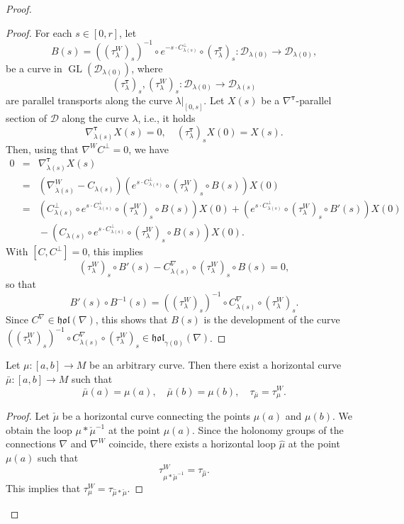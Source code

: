 \documentclass[10pt,a4paper]{amsart}
\newcommand{\D}{{\mathcal D}}
\newcommand{\GL}{\operatorname{GL}}
\newcommand{\bt}{{\boldsymbol{\tau}}}
\newcommand{\hol}{\mathfrak{hol}}
\begin{document}
\begin{proof}
\begin{proof}  For each $s\in [0,r]$, let 
$$B(s)=((\tau_\lambda^W)_s)^{-1}\circ e^{-s\cdot C^\bot_{\lambda(s)}}\circ (\tau_\lambda^\bt)_s:\D_{\lambda(0)}\to \D_{\lambda(0)},$$
be a curve in $\GL(\D_{\lambda(0)})$,
where $$(\tau_\lambda^\bt)_s,(\tau_\lambda^W)_s:\D_{\lambda(0)}\to\D_{\lambda(s)}$$ are parallel transports along the curve $\lambda|_{[0,s]}$.
Let $X(s)$ be a $\nabla^\bt$-parallel section of $\D$ along the curve $\lambda$, i.e., it holds
$$\nabla^\bt_{\dot\lambda(s)}X(s)=0,\quad (\tau_\lambda^\bt)_s X(0)=X(s). $$
Then, using that   $\nabla^W C^\perp=0$, we have 
\begin{eqnarray*}
0&=&\nabla_{\dot\lambda(s)}^\bt X(s)
\\
&=&\left(\nabla^W_{\dot\lambda(s)}-C_{\lambda(s)} \right) \left( e^{s\cdot C^\bot_{\lambda(s)}}\circ (\tau_\lambda^W)_s\circ B(s)\right) X(0)
\\
&=& \left(C^\bot_{\lambda(s)}\circ e^{s\cdot C^\bot_{\lambda(s)}}\circ (\tau_\lambda^W)_s\circ B(s)\right) X(0)+\left( e^{s\cdot C^\bot_{\lambda(s)}}\circ (\tau_\lambda^W)_s\circ B'(s)\right) X(0)
\\
&&{}-\left(C_{\lambda(s)}\circ e^{s\cdot C^\bot_{\lambda(s)}}\circ (\tau_\lambda^W)_s\circ B(s)\right) X(0).
\end{eqnarray*}
With  $[C,C^\perp]=0$, this implies 
$$(\tau_\lambda^W)_s\circ B'(s)-C^\nabla_{\lambda(s)}\circ (\tau_\lambda^W)_s\circ B(s)=0,$$
so that
$$ B'(s)\circ B^{-1}(s)=((\tau_\lambda^W)_s)^{-1}\circ C^\nabla_{\lambda(s)}\circ (\tau_\lambda^W)_s.$$ 
Since $C^\nabla\in \hol(\nabla)$, this  shows that $B(s)$ is the development of the curve 
$((\tau_\lambda^W)_s)^{-1}\circ C^\nabla_{\lambda(s)}\circ (\tau_\lambda^W)_s\in\hol_{\gamma(0)}(\nabla)$. \end{proof}

\begin{lem}\label{lemxi2} Let $\mu:[a,b]\to M$ be an arbitrary curve. Then there exist a horizontal curve $\bar\mu:[a,b]\to M$ such that
	$$\bar\mu(a)=\mu(a),\quad \bar\mu(b)=\mu(b),\quad \tau_{\bar\mu}=\tau^W_\mu.$$ 
\end{lem}

\begin{proof}  Let $\check\mu$ be a horizontal curve connecting the points $\mu(a)$ and $\mu(b)$. We obtain the loop $\mu*\check\mu^{-1}$ at the point $\mu(a)$.
Since the holonomy groups of the connections $\nabla$ and $\nabla^W$ coincide, there exists a horizontal loop $\hat\mu$ at the point $\mu(a)$ such that
$$\tau^W_{\mu*\check\mu^{-1}}=\tau_{\hat\mu}.$$ This implies that 
$\tau^W_{\mu}=\tau_{\hat\mu*\check\mu}$.
\end{proof}



\end{proof}
\end{document}
